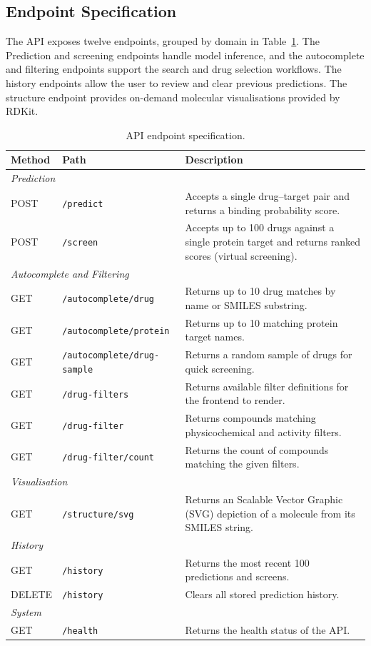 \subsection{Endpoint Specification}
The API exposes twelve endpoints, grouped by domain in Table~\ref{tab:endpoints}.
The Prediction and screening endpoints handle model inference, and the autocomplete and filtering endpoints support the search and drug selection workflows.
The history endpoints allow the user to review and clear previous predictions.
The structure endpoint provides on-demand molecular visualisations provided by RDKit.
\begin{table}[H]
\centering
\caption{API endpoint specification.}
\label{tab:endpoints}
\begin{tabular}{llp{6.5cm}}
\hline
\textbf{Method} & \textbf{Path} & \textbf{Description} \\
\hline
\multicolumn{3}{l}{\textit{Prediction}} \\
POST & \texttt{/predict} & Accepts a single drug--target pair and returns a binding probability score. \\
POST & \texttt{/screen} & Accepts up to 100 drugs against a single protein target and returns ranked scores (virtual screening). \\
\hline
\multicolumn{3}{l}{\textit{Autocomplete and Filtering}} \\
GET & \texttt{/autocomplete/drug} & Returns up to 10 drug matches by name or SMILES substring. \\
GET & \texttt{/autocomplete/protein} & Returns up to 10 matching protein target names. \\
GET & \texttt{/autocomplete/drug-sample} & Returns a random sample of drugs for quick screening. \\
GET & \texttt{/drug-filters} & Returns available filter definitions for the frontend to render. \\
GET & \texttt{/drug-filter} & Returns compounds matching physicochemical and activity filters. \\
GET & \texttt{/drug-filter/count} & Returns the count of compounds matching the given filters. \\
\hline
\multicolumn{3}{l}{\textit{Visualisation}} \\
GET & \texttt{/structure/svg} & Returns an Scalable Vector Graphic (SVG) depiction of a molecule from its SMILES string. \\
\hline
\multicolumn{3}{l}{\textit{History}} \\
GET & \texttt{/history} & Returns the most recent 100 predictions and screens. \\
DELETE & \texttt{/history} & Clears all stored prediction history. \\
\hline
\multicolumn{3}{l}{\textit{System}} \\
GET & \texttt{/health} & Returns the health status of the API. \\
\hline
\end{tabular}
\end{table}

